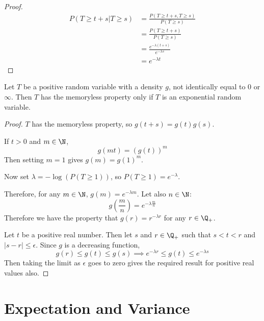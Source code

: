 \documentclass[../Main.tex]{subfiles}
\begin{document}
\begin{proof}
    \begin{align*}
        P(T \geq t + s | T \geq s) &= \frac{P(T \geq t + s, T \geq s)}{P(T \geq s)} \\
        &= \frac{P(T \geq t + s)}{P(T \geq s)} \\
        &= \frac{e^{-\lambda(t + s)}}{e^{-\lambda s}} \\
        &= e^{-\lambda t}
    \end{align*}
\end{proof}
\begin{theorem}
    Let $T$ be a positive random variable with a density $g$, not identically equal to $0$ or $\infty$. Then $T$ has the memoryless property only if $T$ is an exponential random variable.
    \label{thmExpMemorylessUnique}
\end{theorem}
\begin{proof}
    $T$ has the memoryless property, so $g(t + s) = g(t) g(s)$.\par
    If $t > 0$ and $m \in \N$,
    \begin{equation*}
        g(mt) = \left(g(t)\right)^m
    \end{equation*}
    Then setting $m = 1$ gives $g(m) = g(1)^m$.\par
    Now set $\lambda = -\log(P(T \geq 1))$, so $P(T \geq 1) = e^{-\lambda}$.\par
    Therefore, for any $m \in \N$, $g(m) = e^{-\lambda m}$. Let also $n \in \N$:
    \begin{equation*}
        g(\frac{m}{n}) = e^{-\lambda \frac{m}{n}}
    \end{equation*}
    Therefore we have the property that $g(r) = r^{-\lambda r}$ for any $r \in \Q_+$.\par
    Let $t$ be a positive real number. Then let $s$ and $r \in \Q_+$ such that $s < t < r$ and $|s - r| \leq \epsilon$. Since $g$ is a decreasing function,
    \begin{equation*}
        g(r) \leq g(t) \leq g(s) \implies e^{-\lambda r} \leq g(t) \leq e^{-\lambda s}
    \end{equation*}
    Then taking the limit as $\epsilon$ goes to zero gives the required result for positive real values also.
\end{proof}
\section{Expectation and Variance}
\end{document}
